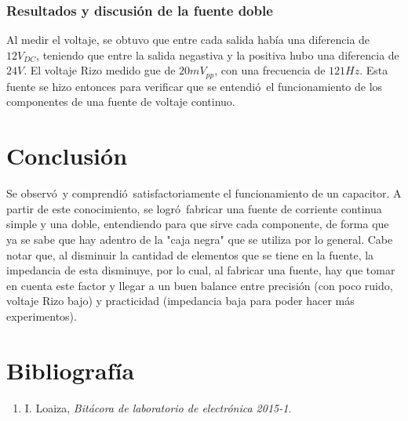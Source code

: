 \documentclass[11pt]{article}
\renewcommand{\=}[1]{\stackrel{#1}{=}} %
\theoremstyle{definition}
\theoremstyle{remark}
\begin{document}
\subsubsection{Resultados y discusi\'on de la fuente doble}
Al medir el voltaje, se obtuvo que entre cada salida hab\'ia una diferencia de $12V_{DC}$, teniendo que entre la salida negastiva y la positiva hubo una diferencia de $24V$. El voltaje Rizo medido gue de $20mV_{pp}$, con una frecuencia de $121Hz$. Esta fuente se hizo entonces para verificar que se entendi\'o\ el funcionamiento de los componentes de una fuente de voltaje continuo.


\section{Conclusi\'on}
Se observ\'o\ y comprendi\'o\ satisfactoriamente el funcionamiento de un capacitor. A partir de este conocimiento, se logr\'o\ fabricar una fuente de corriente continua simple y una doble, entendiendo para que sirve cada componente, de forma que ya se sabe que hay adentro de la "caja negra" que se utiliza por lo general. Cabe notar que, al disminuir la cantidad de elementos que se tiene en la fuente, la impedancia de esta disminuye, por lo cual, al fabricar una fuente, hay que tomar en cuenta este factor y llegar a un buen balance entre precisi\'on (con poco ruido, voltaje Rizo bajo) y practicidad (impedancia baja para poder hacer m\'as experimentos). 

\section{Bibliograf\'ia}
\begin{enumerate}
\item I. Loaiza, \textit{Bit\'acora de laboratorio de electr\'onica 2015-1}.
\end{enumerate}
\end{document}
